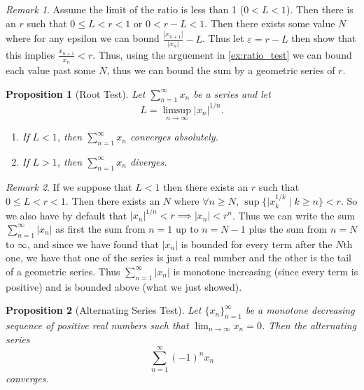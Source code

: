 \documentclass{article}
\newtheorem{proposition}{Proposition}[section]
\theoremstyle{definition}
\theoremstyle{remark}
\newtheorem{remark}{Remark}[section]
\begin{document}
\begin{remark}
Assume the limit of the ratio is less than 1 ($0<L<1$). Then there is an $r$ such that
$0\leq L < r < 1$ or $0 < r-L < 1$. Then there exists some value $N$ where for any epsilon
we can bound $\frac{|x_{n+1}|}{|x_n|} - L$. Thus let $\varepsilon = r-L$ then show that this implies
$\frac{x_{n+1}}{x_n} < r$. Thus, using the arguement in \ref{ex:ratio_test} we can bound each value past some $N$,
thus we can bound the sum by a geometric series of $r$.
\end{remark}










\begin{proposition}[Root Test]\label{prp:root_test}
Let $\sum_{n=1}^{\infty} x_n$ be a series and let
\[
L = \limsup_{n \to \infty} |x_n|^{1/n}.
\]
\begin{enumerate}
\item If $L < 1$, then $\sum_{n=1}^{\infty} x_n$ \textit{converges absolutely}.
\item If $L > 1$, then $\sum_{n=1}^{\infty} x_n$ \textit{diverges}.
\end{enumerate}
\end{proposition}

\begin{remark}
If we suppose that $L<1$ then there exists an $r$ such that $0\leq L < r < 1$. Then
there exists an $N$ where $\forall n \geq N$, $\sup\{|x_k^{1/k} \mid k \geq n\} < r$. 
So we also have by default that $|x_n|^{1/n} < r \implies |x_n| < r^n$. Thus we can
write the sum $\sum_{n=1}^{\infty}{|x_n|}$ as first the sum from $n=1$ up to $n=N-1$ plus 
the sum from $n=N$ to $\infty$, and since we have found that $|x_n|$ is bounded for every term 
after the $N$th one, we have that one of the series is just a real number and the other 
is the tail of a geometric series. Thus $\sum_{n=1}^{\infty}{|x_n|}$ is monotone increasing (since 
every term is positive) and is bounded above (what we just showed).
\end{remark}






\begin{proposition}[Alternating Series Test]\label{prp:alt_series_test}
Let \( \{x_n\}_{n=1}^\infty \) be a monotone decreasing sequence of positive real numbers such that \(\lim_{n \to \infty} x_n = 0\). Then the alternating series
\[
\sum_{n=1}^\infty (-1)^n x_n
\]
converges.
\end{proposition}
\end{document}
